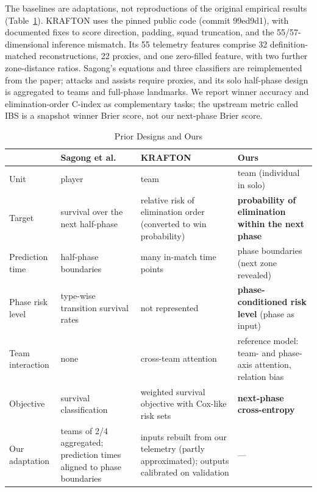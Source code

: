 \documentclass[sigconf,anonymous,nonacm]{acmart}
\begin{document}
The baselines are adaptations, not reproductions of the original empirical results (Table~\ref{tab:compare}). KRAFTON uses the pinned public code (commit 99ed9d1), with documented fixes to score direction, padding, squad truncation, and the 55/57-dimensional inference mismatch. Its 55 telemetry features comprise 32 definition-matched reconstructions, 22 proxies, and one zero-filled feature, with two further zone-distance ratios. Sagong's equations and three classifiers are reimplemented from the paper; attacks and assists require proxies, and its solo half-phase design is aggregated to teams and full-phase landmarks. We report winner accuracy and elimination-order C-index as complementary tasks; the upstream metric called IBS is a snapshot winner Brier score, not our next-phase Brier score.

\begin{table}[t]
\centering
\caption{Prior Designs and Ours}
\label{tab:compare}
\footnotesize
\begin{tabular}{p{}p{}p{}p{}}
\hline
 & Sagong et al.~\cite{Sagong25a} & KRAFTON~\cite{KRAFTON} & Ours \\
\hline
Unit & player & team & team (individual in solo) \\
Target & survival over the next half-phase & relative risk of elimination order (converted to win probability) & \textbf{probability of elimination within the next phase} \\
Prediction time & half-phase boundaries & many in-match time points & phase boundaries (next zone revealed) \\
Phase risk level & type-wise transition survival rates & not represented & \textbf{phase-conditioned risk level} (phase as input) \\
Team interaction & none & cross-team attention & reference model: team- and phase-axis attention, relation bias \\
Objective & survival classification & weighted survival objective with Cox-like risk sets & \textbf{next-phase cross-entropy} \\
\hline
Our adaptation & teams of 2/4 aggregated; prediction times aligned to phase boundaries & inputs rebuilt from our telemetry (partly approximated); outputs calibrated on validation & --- \\
\hline
\end{tabular}
\end{table}
\end{document}
